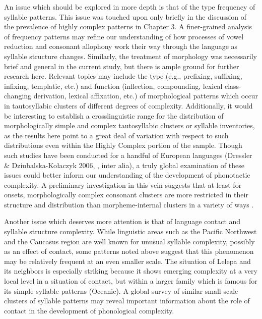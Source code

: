   An issue which should be explored in more depth is that of the type frequency of syllable patterns. This issue was touched upon only briefly in the discussion of the prevalence of highly complex patterns in Chapter 3. A finer-grained analysis of frequency patterns may refine our understanding of how processes of vowel reduction and consonant allophony work their way through the language as syllable structure changes. Similarly, the treatment of morphology was necessarily brief and general in the current study, but there is ample ground for further research here. Relevant topics may include the type (e.g., prefixing, suffixing, infixing, templatic, etc.) and function (inflection, compounding, lexical class-changing derivation, lexical affixation, etc.) of morphological patterns which occur in tautosyllabic clusters of different degrees of complexity. Additionally, it would be interesting to establish a crosslinguistic range for the distribution of morphologically simple and complex tautosyllabic clusters or syllable inventories, as the results here point to a great deal of variation with respect to such distributions even within the Highly Complex portion of the sample. Though such studies have been conducted for a handful of European languages (Dressler \& Dziubalska-Kołaczyk 2006, \citealt{DresslerEtAl2010}, inter alia), a truly global examination of these issues could better inform our understanding of the development of phonotactic complexity. A preliminary investigation in this vein suggests that at least for onsets, morphologically complex consonant clusters are more restricted in their structure and distribution than morpheme-internal clusters in a variety of ways \citep{Easterday2019}.



  Another issue which deserves more attention is that of language contact and syllable structure complexity. While linguistic areas such as the Pacific Northwest and the Caucasus region are well known for unusual syllable complexity, possibly as an effect of contact, some patterns noted above suggest that this phenomenon may be relatively frequent at an even smaller scale. The situation of Lelepa and its neighbors is especially striking because it shows emerging complexity at a very local level in a situation of contact, but within a larger family which is famous for its simple syllable patterns (Oceanic). A global survey of similar small-scale clusters of syllable patterns may reveal important information about the role of contact in the development of phonological complexity.



